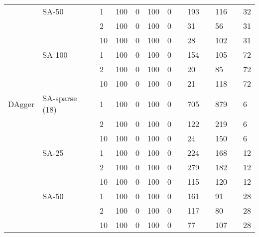 \begin{tabular}{|P{0.6cm}P{1.1cm}P{0.75cm}||P{0.5cm}P{0.5cm}|P{0.5cm}P{0.5cm}|P{0.5cm}P{0.5cm}|P{0.5cm}P{0.5cm}|P{0.5cm}P{0.5cm}|}
       & SA-50 & 1   &     100 &   0 &  100 &   0 &         &   193 &    &   116 &          &  32 \\
       &       & 2   &     100 &   0 &  100 &   0 &          &    31 &   &    56 &          &  31 \\
       &       & 10  &     100 &   0 &  100 &   0 &          &    28 &   &   102 &          &  31 \\

       & SA-100& 1   &     100 &   0 &  100 &   0 &         &   154 &     &   105 &          &  72 \\
       &       & 2   &     100 &   0 &  100 &   0 &          &    20 &     &    85 &          &  72 \\
       &       & 10  &     100 &   0 &  100 &   0 &          &    21 &     &   118 &          &  72 \\
\hline
DAgger & SA-sparse (18)&1& 100 &   0 &  100 &   0 &         &   705 &    &   879 &           &   6 \\
       &       & 2   &     100 &   0 &  100 &   0 &         &   122 &    &   219 &           &   6 \\
       &       & 10  &     100 &   0 &  100 &   0 &          &    24 &    &   150 &          &   6 \\

       & SA-25 & 1   &     100 &   0 &  100 &   0 &         &   224 &    &   168 &           &  12 \\
       &       & 2   &     100 &   0 &  100 &   0 &         &   279 &    &   182 &           &  12 \\
       &       & 10  &     100 &   0 &  100 &   0 &         &   115 &    &   120 &          &  12 \\

       & SA-50 & 1   &     100 &   0 &  100 &   0 &         &   161 &     &    91 &          &  28 \\
       &       & 2   &    100 &   0 &  100 &   0 &          &   117 &     &    80 &          &  28 \\
       &       & 10  &     100 &   0 &  100 &   0 &          &    77 &     &   107 &          &  28 \\


\end{tabular}
